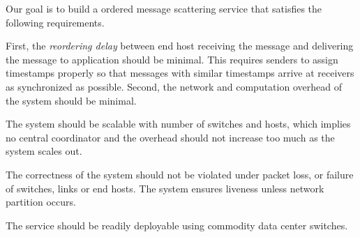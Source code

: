 Our goal is to build a ordered message scattering service that satisfies the following requirements.


First, the \textit{reordering delay} between end host receiving the message and delivering the message to application should be minimal.
This requires senders to assign timestamps properly so that messages with similar timestamps arrive at receivers as synchronized as possible.
Second, the network and computation overhead of the system should be minimal.

The system should be scalable with number of switches and hosts, which implies no central coordinator and the overhead should not increase too much as the system scales out.





The correctness of the system should not be violated under packet loss, or failure of switches, links or end hosts.
The system ensures liveness unless network partition occurs.


The service should be readily deployable using commodity data center switches.

\fi
